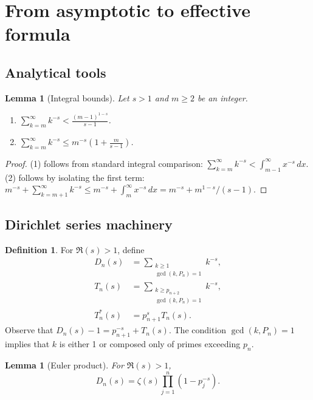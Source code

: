 \documentclass[12pt]{article}
\theoremstyle{plain}
\newtheorem{lemma}[theorem]{Lemma}
\theoremstyle{definition}
\newtheorem{definition}[theorem]{Definition}
\theoremstyle{remark}
\begin{document}
\section{From asymptotic to effective formula}

\subsection{Analytical tools}

\begin{lemma}[Integral bounds]
\label{lem:integral}
Let $s > 1$ and $m \geq 2$ be an integer.
\begin{enumerate}
\item $\displaystyle\sum_{k=m}^{\infty} k^{-s} < \frac{(m-1)^{1-s}}{s-1}$.
\item $\displaystyle\sum_{k=m}^{\infty} k^{-s} \le m^{-s} \left(1 + \frac{m}{s-1}\right)$.
\end{enumerate}
\end{lemma}

\begin{proof}
(1) follows from standard integral comparison: $\sum_{k=m}^\infty k^{-s} < \int_{m-1}^\infty x^{-s}\,dx$.
(2) follows by isolating the first term: $m^{-s} + \sum_{k=m+1}^\infty k^{-s} \leq m^{-s} + \int_m^\infty x^{-s}\,dx = m^{-s} + m^{1-s}/(s-1)$.
\end{proof}

\subsection{Dirichlet series machinery}

\begin{definition}
For $\Re(s) > 1$, define
\begin{align*}
D_n(s) &= \sum_{\substack{k \geq 1 \\ \gcd(k,P_n)=1}} k^{-s}, \\
T_n(s) &= \sum_{\substack{k \geq p_{n+2} \\ \gcd(k,P_n)=1}} k^{-s}, \\
T_n^*(s) &= p_{n+1}^s T_n(s).
\end{align*}
Observe that $D_n(s) - 1 = p_{n+1}^{-s} + T_n(s)$. The condition $\gcd(k, P_n)=1$ implies that $k$ is either 1 or composed only of primes exceeding $p_n$.
\end{definition}

\begin{lemma}[Euler product]
\label{lem:euler}
For $\Re(s) > 1$,
\[
D_n(s) = \zeta(s) \prod_{j=1}^{n} (1 - p_j^{-s}).
\]
\end{lemma}
\end{document}

